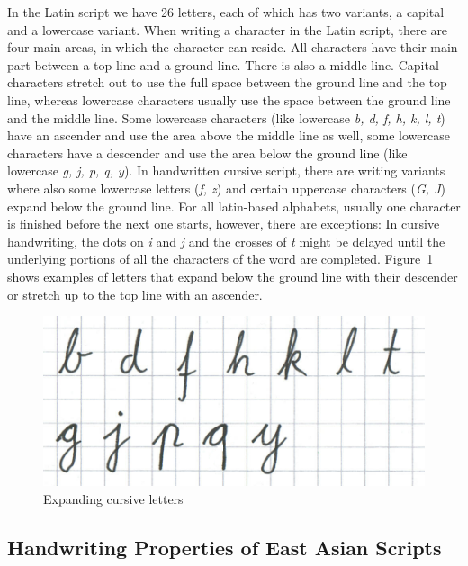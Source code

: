 In the Latin script we have 26 letters, each of which has two variants, 
a capital and a lowercase variant. When writing a character 
in the Latin script, there are four main areas, in which the character 
can reside. All characters have their main part between a top line and a 
ground line. There is also a middle line. Capital characters stretch out to use
the full space between the ground line and the top line, whereas lowercase 
characters usually use the space between the ground line and the middle line. 
Some lowercase characters (like lowercase \emph{b, d, f, h, k, l, t}) have an
ascender and use the area above the middle line as well, 
some lowercase characters have a descender and use the area below the ground 
line (like lowercase \emph{g, j, p, q, y}). In handwritten cursive script, 
there are writing variants where also some lowercase letters (\emph{f, z}) and
certain uppercase characters (\emph{G, J}) expand below the ground line.
For all latin-based alphabets, usually one character is finished before the 
next one starts, however, there are exceptions:
In cursive handwriting, the dots on \emph{i} and \emph{j} and the crosses
of \emph{t} might be delayed until the underlying portions of all 
the characters of the word are completed. 
Figure~\ref{fig:expandingcursiveletters} shows examples of letters that expand 
below the ground line with their descender or stretch up to the top line with
an ascender.


\begin{figure}[htbp]
\begin{center}
\includegraphics[scale=0.5]{images/expandingcursiveletters.png}
\caption{Expanding cursive letters}
\label{fig:expandingcursiveletters}
\end{center}
\end{figure}

\subsection{Handwriting Properties of East Asian Scripts}
\label{sec:handwritingpropertieseastasian}

